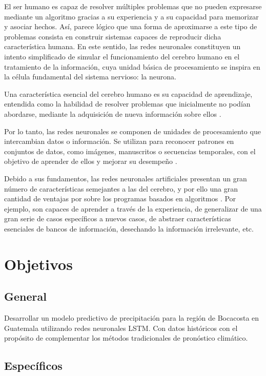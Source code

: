 \documentclass[titlepage,11pt]{report}
\begin{document}
El ser humano es capaz de resolver múltiples problemas que no pueden expresarse mediante un algoritmo gracias a su experiencia y a su capacidad para memorizar y asociar hechos. Así, parece lógico que una forma de aproximarse a este tipo de problemas consista en construir sistemas capaces de reproducir dicha característica humana. En este sentido, las redes neuronales constituyen un intento simplificado de simular el funcionamiento del cerebro humano en el tratamiento de la información, cuya unidad básica de procesamiento se inspira en la célula fundamental del sistema nervioso: la neurona.

Una característica esencial del cerebro humano es su capacidad de aprendizaje, entendida como la habilidad de resolver problemas que inicialmente no podían abordarse, mediante la adquisición de nueva información sobre ellos \citep{matich2001redes, salas2004redes, tablada2009redes, izaurieta2000redes}.

Por lo tanto, las redes neuronales se componen de unidades de procesamiento que intercambian datos o información. Se utilizan para reconocer patrones en conjuntos de datos, como imágenes, manuscritos o secuencias temporales, con el objetivo de aprender de ellos y mejorar su desempeño \citep{matich2001redes}.

Debido a sus fundamentos, las redes neuronales artificiales presentan un gran número de características semejantes a las del cerebro, y por ello una gran cantidad de ventajas por sobre los programas basados en algoritmos \cite{McCullochPitts1943}. Por ejemplo, son capaces de aprender a través de la experiencia, de generalizar de una gran serie de casos específicos a nuevos casos, de abstraer características esenciales de bancos de información, desechando la información irrelevante, etc. 

\chapter{Objetivos}
\label{sec:objetivos}
\section{General}
\label{sec:general}

Desarrollar un modelo predictivo de precipitación para la región de Bocacosta en Guatemala utilizando redes neuronales LSTM. Con datos históricos con el propósito de complementar los métodos tradicionales de pronóstico climático. 

\section{Específicos}
\label{sec:especificos}
\end{document}
